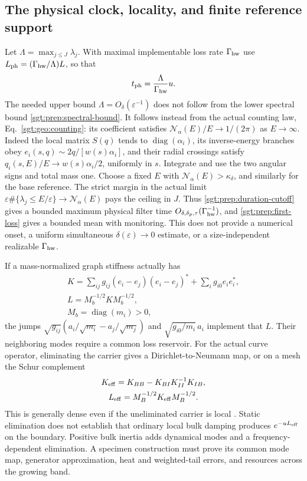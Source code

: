 \documentclass[aps,pra,reprint,superscriptaddress,longbibliography]{revtex4-2}
\begin{document}
\subsection{The physical clock, locality, and finite reference support}
\label{sgt:prep:physical-scope}

Let $\Lambda=\max_{j\le J}\lambda_j$. With maximal implementable loss
rate $\Gamma_{\rm hw}$ use
$L_{\rm ph}=(\Gamma_{\rm hw}/\Lambda)L$, so that
\begin{equation}
 t_{\rm ph}=\frac{\Lambda}{\Gamma_{\rm hw}}u.
 \label{sgt:prep:physical-clock}
\end{equation}
The needed upper bound $\Lambda=O_\delta(\varepsilon^{-1})$
does not follow from the lower spectral bound
\eqref{sgt:prep:spectral-bound}. It follows instead from the actual
counting law, Eq.~\eqref{sgt:geo:counting}: its coefficient satisfies
$\mathcal N_\alpha(E)/E\to1/(2\pi)$ as $E\to\infty$.
Indeed the local matrix $S(q)$ tends to
$\operatorname{diag}(\alpha_i)$, its inverse-energy branches obey
$e_i(s,q)\sim2q/[w(s)\alpha_i]$, and their radial crossings satisfy
$q_i(s,E)/E\to w(s)\alpha_i/2$, uniformly in $s$.
Integrate and use the two angular signs and total mass one.
Choose a fixed $E$ with $\mathcal N_\alpha(E)>\kappa_\delta$,
and similarly for the base reference. The strict margin in the actual
limit $\varepsilon\#\{\lambda_j\le E/\varepsilon\}
\to\mathcal N_\alpha(E)$ pays the ceiling in $J$.
Thus \eqref{sgt:prep:duration-cutoff} gives a bounded maximum
physical filter time $O_{\delta,\delta_p,\tau}(\Gamma_{\rm hw}^{-1})$,
and \eqref{sgt:prep:first-loss} gives a bounded mean with monitoring.
This does not provide a numerical onset, a uniform simultaneous
$\delta(\varepsilon)\to0$ estimate, or a size-independent realizable
$\Gamma_{\rm hw}$.

If a mass-normalized graph stiffness actually has
\[
\begin{gathered}
 K=\sum_{ij}g_{ij}(e_i-e_j)(e_i-e_j)^*
       +\sum_i g_{i0}e_ie_i^*,\\
 L=M_b^{-1/2}KM_b^{-1/2},\\
 M_b=\operatorname{diag}(m_i)>0,
\end{gathered}
\]
the jumps
$\sqrt{g_{ij}}(a_i/\sqrt{m_i}-a_j/\sqrt{m_j})$ and
$\sqrt{g_{i0}/m_i}\,a_i$ implement that $L$.
Their neighboring modes require a common loss reservoir.
For the actual curve operator, eliminating the carrier gives a
Dirichlet-to-Neumann map, or on a mesh the Schur complement
\[
\begin{gathered}
 K_{\rm eff}=K_{BB}-K_{BI}K_{II}^{-1}K_{IB},\\
 L_{\rm eff}=M_B^{-1/2}K_{\rm eff}M_B^{-1/2}.
\end{gathered}
\]
This is generally dense even if the uneliminated carrier is local
\cite{DorflerBullo2013}. Static elimination does not establish that
ordinary local bulk damping produces $e^{-uL_{\rm eff}}$ on the
boundary. Positive bulk inertia adds dynamical modes and a
frequency-dependent elimination. A specimen construction must prove
its common mode map, generator approximation, heat and weighted-tail
errors, and resources across the growing band.
\end{document}
